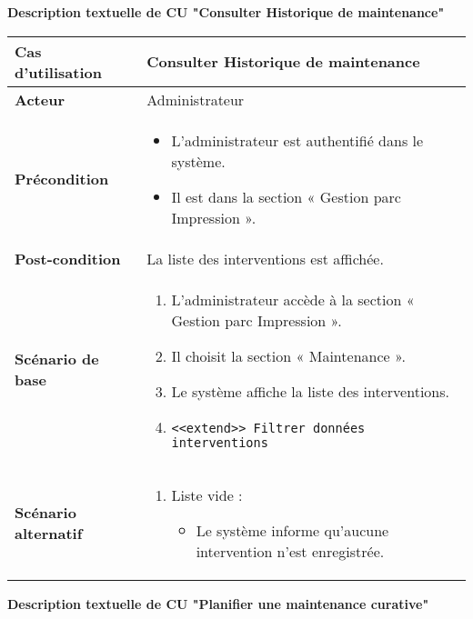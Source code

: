 \documentclass[a4paper,11pt]{report}
\begin{document}
\textbf{Description textuelle de CU "Consulter Historique de maintenance"}

\begin{tabularx}{\textwidth}{|>{\bfseries}l|X|}
\hline
Cas d’utilisation    & Consulter Historique de maintenance \\
\hline
Acteur               & Administrateur \\
\hline
Précondition         &
\begin{itemize}[left=0pt]
  \item L’administrateur est authentifié dans le système.
  \item Il est dans la section « Gestion parc Impression ».
\end{itemize} \\
\hline
Post-condition       & La liste des interventions est affichée. \\
\hline
Scénario de base     &
\begin{enumerate}[left=0pt]
  \item L’administrateur accède à la section « Gestion parc Impression ».
  \item Il choisit la section « Maintenance ».
  \item Le système affiche la liste des interventions.
  \item \texttt{<<extend>> Filtrer données interventions}
\end{enumerate} \\
\hline
Scénario alternatif   &
\begin{enumerate}[label=\arabic*.a,wide=0pt]
  \item Liste vide :
    \begin{itemize}[left=1em]
      \item Le système informe qu’aucune intervention n’est enregistrée.
    \end{itemize}
\end{enumerate} \\
\hline
\end{tabularx}


\textbf{Description textuelle de CU "Planifier une maintenance curative"}
\end{document}
